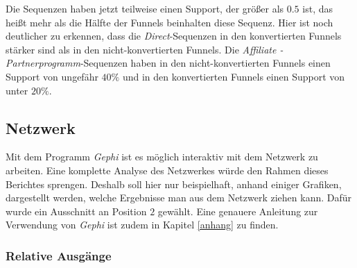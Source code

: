 Die Sequenzen haben jetzt teilweise einen Support, der größer als $0.5$ ist, das heißt mehr als die Hälfte der Funnels beinhalten diese Sequenz. Hier ist noch deutlicher zu erkennen, dass die \textit{Direct}-Sequenzen in den konvertierten Funnels stärker sind als in den nicht-konvertierten Funnels. Die \textit{Affiliate - Partnerprogramm}-Sequenzen haben in den nicht-konvertierten Funnels einen Support von ungefähr $40 \%$ und in den konvertierten Funnels einen Support von unter $20 \%$.\\

\subsection{Netzwerk}\label{resultsnetwork}

Mit dem Programm \textit{Gephi} ist es möglich interaktiv mit dem Netzwerk zu arbeiten. Eine komplette Analyse des Netzwerkes würde den Rahmen dieses Berichtes sprengen. Deshalb soll hier nur beispielhaft, anhand einiger Grafiken, dargestellt werden, welche Ergebnisse man aus dem Netzwerk ziehen kann. Dafür wurde ein Ausschnitt an Position $2$ gewählt. Eine genauere Anleitung zur Verwendung von \textit{Gephi} ist zudem in Kapitel \ref{anhang} zu finden.

\subsubsection*{Relative Ausgänge}


